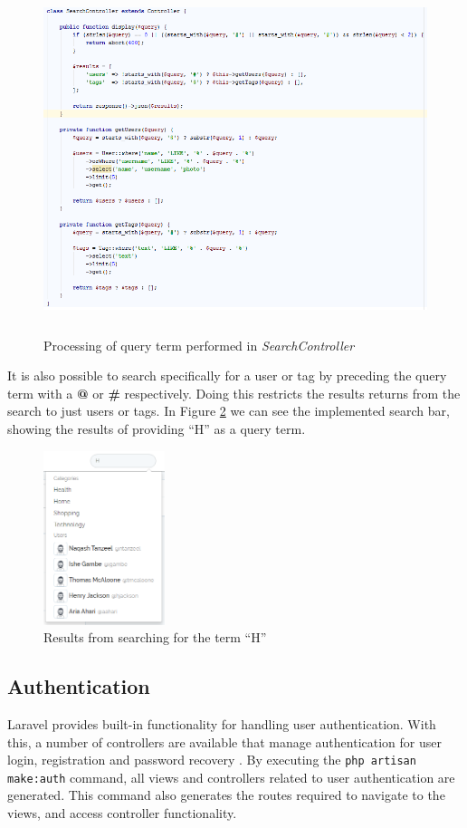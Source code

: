 \begin{figure}[H]
\centering
\includegraphics[height=4in]{Images/Implementation/SearchController}
\caption{Processing of query term performed in \textit{SearchController}}
\label{fig:SearchController}
\end{figure}

\noindent It is also possible to search specifically for a user or tag by preceding the query term with a \textbf{@} or \textbf{\#} respectively. Doing this restricts the results returns from the search to just users or tags. In Figure \ref{fig:SearchResults} we can see the implemented search bar, showing the results of providing ``H'' as a query term.

\begin{figure}[H]
\centering
\includegraphics[height=2in]{Images/Implementation/SearchResults}
\caption{Results from searching for the term ``H''}
\label{fig:SearchResults}
\end{figure}

\subsection{Authentication}
Laravel provides built-in functionality for handling user authentication. With this, a number of controllers are available that manage authentication for user login, registration and password recovery \cite{Laravel:Authentication}. By executing the \texttt{php artisan make:auth} command, all views and controllers related to user authentication are generated. This command also generates the routes required to navigate to the views, and access controller functionality.

